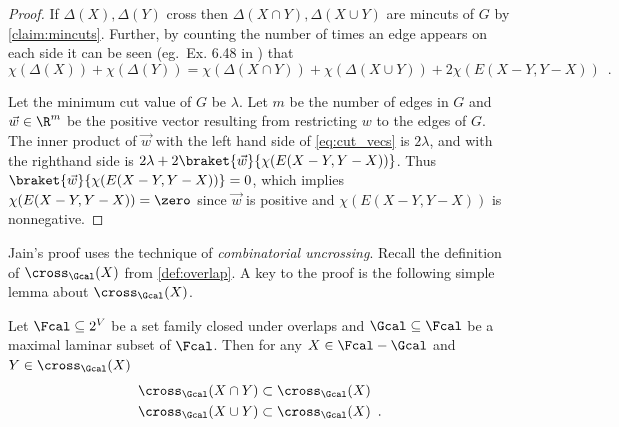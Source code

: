 \begin{proof}
If $\Delta(X), \Delta(Y)$ cross then
$\Delta(X \cap Y), \Delta(X \cup Y)$ are mincuts of $G$ by \cref{claim:mincuts}.
Further, by counting the number of times an edge appears on each side it can be seen (eg.\ Ex. 6.48 in \cite{Lov93}) that
\begin{equation}
\label{eq:cut_vecs}
\chi(\Delta(X)) + \chi(\Delta(Y)) = \chi(\Delta(X \cap Y)) + \chi(\Delta(X \cup Y)) + 2\chi(E(X-Y, Y-X)) \enspace.
\end{equation}

Let the minimum cut value of $G$ be $\lambda$.  Let $m$ be the number of edges in $G$ and
$\vec{w} \in \R^m$ be the positive vector resulting from restricting $w$ to the edges of $G$.
The inner product of $\vec{w}$ with the left hand side of \cref{eq:cut_vecs}
is $2\lambda$, and with the righthand side is $2\lambda  + 2 \braket{\vec{w}}{\chi(E(X-Y, Y-X))}$.  Thus $\braket{\vec{w}}{\chi(E(X-Y, Y-X))} = 0$,
which implies $\chi(E(X-Y, Y-X)) = \zero$ since
$\vec{w}$ is positive and $\chi(E(X-Y, Y-X))$ is nonnegative.
\end{proof}


Jain's proof uses the technique of \emph{combinatorial uncrossing}.
Recall the definition of $\cross_{\Gcal}(X)$ from \cref{def:overlap}.   A key to the proof is the following simple lemma about
$\cross_{\Gcal}(X)$.
%
\begin{lemma}
\label{lem:intersect}
Let $\Fcal \subseteq 2^{V}$ be a set family closed under overlaps and $\Gcal \subseteq \Fcal$ be a maximal laminar subset of $\Fcal$.
Then for any $X \in \Fcal - \Gcal$ and $Y \in \cross_{\Gcal}(X)$
\begin{align}
\label{eq:con_cap}
\cross_{\Gcal}(X \cap Y) & \subset \cross_{\Gcal}(X) \\
\label{eq:con_cup}
\cross_{\Gcal}(X \cup Y) &\subset \cross_{\Gcal}(X) \enspace .
\end{align}
\end{lemma}


